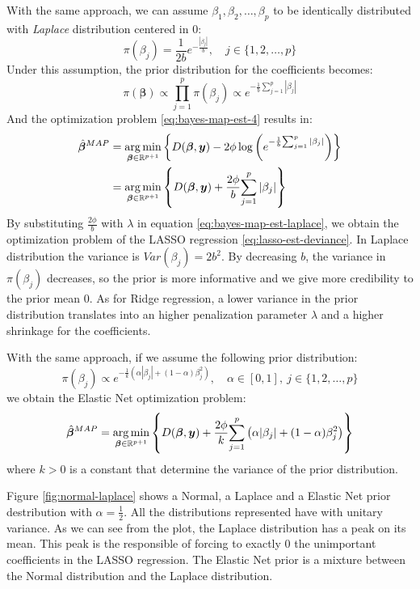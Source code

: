 \documentclass[a4paper, nobind]{templates/ociamthesis}
\theoremstyle{definition}
\theoremstyle{definition}
\theoremstyle{definition}
\theoremstyle{remark}
\begin{document}
With the same approach, we can assume \(\beta_1, \beta_2, \dots, \beta_p\) to be identically distributed with \emph{Laplace} distribution centered in \(0\):
\[
\pi(\beta_j) = \frac{1}{2b}e^{-\frac{|\beta_j|}{b}}, \quad j\in\{1,2,\dots,p\}
\]
Under this assumption, the prior distribution for the coefficients becomes:
\begin{equation}
\label{eq:bayes-glm-prior-laplace}
\pi(\boldsymbol{\beta}) \propto \prod_{j=1}^{p}{\pi(\beta_j)} \propto e^{-\frac{1}{b}{\sum_{j=1}^{p}{|\beta_j|}}} 
\end{equation}
And the optimization problem \eqref{eq:bayes-map-est-4} results in:
\begin{align}
\nonumber
\hat{\boldsymbol{\beta}}^{MAP} & =
\operatorname*{arg\,min}_{\boldsymbol{\beta}\in\mathbb{R}^{p+1}}{\left\{
D(\boldsymbol{\beta}, \boldsymbol{y}) -2\phi \log{\left(e^{-\frac{1}{b}{\sum_{j=1}^{p}{|\beta_j|}}}\right)} \right\}}  \\
\label{eq:bayes-map-est-laplace}
& = \operatorname*{arg\,min}_{\boldsymbol{\beta}\in\mathbb{R}^{p+1}}{\left\{
D(\boldsymbol{\beta}, \boldsymbol{y}) + \frac{2\phi}{b} {\sum_{j=1}^{p}{|\beta_j|}}\right\}}
\end{align}
By substituting \(\frac{2\phi}{b}\) with \(\lambda\) in equation \eqref{eq:bayes-map-est-laplace}, we obtain the optimization problem of the LASSO regression \eqref{eq:lasso-est-deviance}. In Laplace distribution the variance is \(Var(\beta_j) = 2b^2\). By decreasing \(b\), the variance in \(\pi(\beta_j)\) decreases, so the prior is more informative and we give more credibility to the prior mean \(0\). As for Ridge regression, a lower variance in the prior distribution translates into an higher penalization parameter \(\lambda\) and a higher shrinkage for the coefficients.

With the same approach, if we assume the following prior distribution:
\[
\pi(\beta_j) \propto e^{-\frac{1}{k}\left(\alpha|\beta_j| + (1-\alpha)\beta_j^2\right)}, \quad \alpha\in[0,1], \ j\in\{1,2,\dots,p\}
\]
we obtain the Elastic Net optimization problem:
\[
\hat{\boldsymbol{\beta}}^{MAP} = \operatorname*{arg\,min}_{\boldsymbol{\beta}\in\mathbb{R}^{p+1}}{\left\{
D(\boldsymbol{\beta}, \boldsymbol{y}) + \frac{2\phi}{k} {\sum_{j=1}^{p}{\left(\alpha|\beta_j| + (1-\alpha)\beta_j^2\right)}}\right\}}
\]
where \(k>0\) is a constant that determine the variance of the prior distribution.

Figure \ref{fig:normal-laplace} shows a Normal, a Laplace and a Elastic Net prior destribution with \(\alpha=\frac{1}{2}\). All the distributions represented have with unitary variance. As we can see from the plot, the Laplace distribution has a peak on its mean. This peak is the responsible of forcing to exactly \(0\) the unimportant coefficients in the LASSO regression. The Elastic Net prior is a mixture between the Normal distribution and the Laplace distribution.
\end{document}
